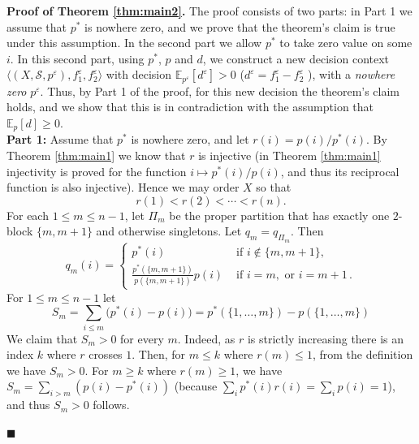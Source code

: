 \documentclass[10pt, letterpaper]{article}%
\theoremstyle{definition}
\renewenvironment{proof}[1][\unskip]{%
\par
\noindent
\textbf{Proof #1.}
\noindent}
{\hfill$\blacksquare$

\bigskip}
\newcommand{\E}{\mathbb E}
\newcommand{\1}{\mathbf 1}
\def\change{\marginpar[\hfill Change]{Change}}
\def\changeA{\marginpar[\hfill $\downarrow$Change]{Change$\downarrow$}}
\def\changeZ{\marginpar[\hfill $\uparrow$Change]{Change$\uparrow$}}
\begin{document}
\begin{proof}[of Theorem \ref{thm:main2}] %
The proof consists of two parts: in Part 1 we assume that $p^*$ is nowhere zero, and we prove that the theorem's claim is true under this assumption. In the second part we allow $p^*$ to take zero value on some $i$. In this second part, using $p^*$, $p$ and $d$, we construct a new decision context $\big\langle (X,\mathcal{S},p^{\varepsilon}),f^{\varepsilon}_1,f^{\varepsilon}_2\big\rangle$ with decision $\E_{p^\varepsilon}[d^{\varepsilon}]>0$ ($d^{\varepsilon}=f^{\varepsilon}_1-f^{\varepsilon}_2$ ), with a \emph{nowhere zero} $p^{\varepsilon}$. Thus, by Part 1 of the proof, for this new decision the theorem's claim holds, and we show that this is in contradiction with the assumption that $\E_p[d]\geq 0$.  \\ 

{\bf Part 1:}
    Assume that $p^*$ is nowhere zero, and let 
    $r(i) = p(i)/p^*(i)$. 
	By Theorem \ref{thm:main1} we know that $r$ is injective (in Theorem \ref{thm:main1} injectivity is proved for the function $i\mapsto p^*(i)/p(i)$,
    and thus its reciprocal function is also injective). Hence we may order $X$ so that 
	\[
		r(1)<r(2)<\cdots<r(n).
	\]
	For each $1\leq m \leq n-1$, let $\Pi_m$ be the proper partition that has exactly one $2$-block
	$\{m,m+1\}$ and otherwise singletons. Let $q_m=q_{\Pi_m}$. Then
	\[
		q_m(i) = \begin{cases}
			p^*(i) & \text{ if } i\notin\{m,m+1\},\\
			\frac{p^*(\{m,m+1\})}{p(\{m, m+1\})} p(i) & \text{ if } i=m, \text{ or } i=m+1\,.			
		\end{cases}
	\]
	For $1\leq m\leq n-1$ let
	\[
		S_m =\sum_{i\le m}\bigl(p^*(i)-p(i)\bigr) = p^*(\{1, \ldots, m\}) - p(\{1, \ldots, m\})
	\]
	We claim that $S_m>0$ for every $m$. Indeed, as $r$ is strictly increasing there is an index $k$ where $r$ crosses $1$.
	Then, for $m\leq k$ where $r(m)\leq 1$, from the definition we have $S_m > 0$. For $m\geq k$ where $r(m)\geq 1$,
	we have $S_m=\sum_{i>m}(p(i)-p^*(i))$  (because $\sum_i p^*(i)r(i)=\sum_i p(i)=1$), and thus $S_m>0$ follows.


\end{proof}
\end{document}
